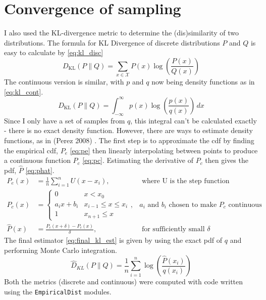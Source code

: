 \section{Convergence of sampling}
I also used the KL-divergence metric to determine the (dis)similarity of two distributions. The formula for KL Divergence of discrete distributions $P$ and $Q$ is easy to calculate by \eqref{eq:kl_disc}
% 
\[{D_{\text{KL}}(P\parallel Q)=\sum _{x\in {\mathcal {X}}}P(x)\log \left({\frac {P(x)}{Q(x)}}\right)}\] \label{eq:kl_disc}
% 
The continuous version is similar, with $p$ and $q$ now being density functions as in \eqref{eq:kl_cont}. 
% 
\[{D_\text{KL}}(P\parallel Q)=\int _{-\infty }^{\infty }p(x)\log \left({\frac {p(x)}{q(x)}}\right)\,dx\] \label{eq:kl_cont}
% 
Since I only have a set of samples from $q$, this integral can't be calculated exactly - there is no exact density function. However, there are ways to estimate density functions, as in (Perez 2008) \cite{perez2008kullback}. The first step is to approximate the cdf by finding the empirical cdf, $P_e$ \eqref{eq:pe} then linearly interpolating between points to produce a continuous function $P_c$ \eqref{eq:pc}. Estimating the derivative of $P_c$ then gives the pdf, $\hat{P}$ \eqref{eq:phat}. 
% 
\begin{align}
	P_e(x)     & = \frac1{n}\sum_{i=1}^n U(x-x_i) ,        & \text{ where U is the step function}\label{eq:pe}      \\ 
	P_c(x)     & = \begin{cases}                                                                                
	0          & x<x_0                                                                                          \\
	a_ix+b_i   & x_{i-1} \leq x \le x_i                                                                         \\
	1          & x_{n+1} \leq x                                                                                 
	\end{cases} \label{eq:pc} ,& \text{$a_i$ and $b_i$ chosen to make $P_c$ continuous }\\ 
	\hat{P}(x) & = \frac{P_c(x+\delta) - P_c(x)}{\delta} , & \text{ for sufficiently small }\delta  \label{eq:phat} 
\end{align}
% 
The final estimator \eqref{eq:final_kl_est} is given by using the exact pdf of $q$ and performing Monte Carlo integration.
% 
\begin{equation}
	\label{eq:final_kl_est}
	\hat{D}_{KL}(P \| Q) = \frac1{n}\sum_{i=1}^n \log\left(\frac{\hat{P}(x_i)}{q(x_i)}\right) 
\end{equation}
% 
Both the metrics (discrete and continuous) were computed with code written using the \texttt{EmpiricalDist} modules.

